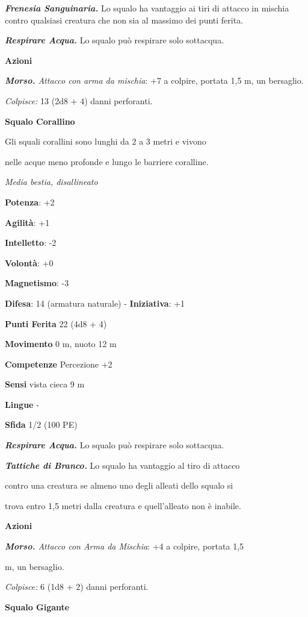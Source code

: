 \begin{multicols}{2}
\emph{\textbf{Frenesia Sanguinaria.}} Lo squalo ha vantaggio ai tiri di
attacco in mischia contro qualsiasi creatura che non sia al massimo dei
punti ferita.

\emph{\textbf{Respirare Acqua.}} Lo squalo può respirare solo sottacqua.

\textbf{Azioni}

\emph{\textbf{Morso.} Attacco con arma da mischia}: +7 a colpire,
portata 1,5 m, un bersaglio.

\emph{Colpisce:} 13 (2d8 + 4) danni perforanti.

\textbf{Squalo Corallino}

Gli squali corallini sono lunghi da 2 a 3 metri e vivono

nelle acque meno profonde e lungo le barriere coralline.

\emph{Media bestia, disallineato}

\textbf{Potenza}: +2

\textbf{Agilità}: +1

\textbf{Intelletto}: -2

\textbf{Volontà}: +0

\textbf{Magnetismo}: -3

\textbf{Difesa}: 14 (armatura naturale) - \textbf{Iniziativa}: +1

\textbf{Punti Ferita} 22 (4d8 + 4)

\textbf{Movimento} 0 m, nuoto 12 m

\textbf{Competenze} Percezione +2

\textbf{Sensi} vista cieca 9 m

\textbf{Lingue} -

\textbf{Sfida} 1/2 (100 PE)

\emph{\textbf{Respirare Acqua.}} Lo squalo può respirare solo sottacqua.

\emph{\textbf{Tattiche di Branco.}} Lo squalo ha vantaggio al tiro di
attacco

contro una creatura se almeno uno degli alleati dello squalo si

trova entro 1,5 metri dalla creatura e quell'alleato non è inabile.

\textbf{Azioni}

\emph{\textbf{Morso.} Attacco con Arma da Mischia}: +4 a colpire,
portata 1,5

m, un bersaglio.

\emph{Colpisce:} 6 (1d8 + 2) danni perforanti.

\textbf{Squalo Gigante}


\end{multicols}
